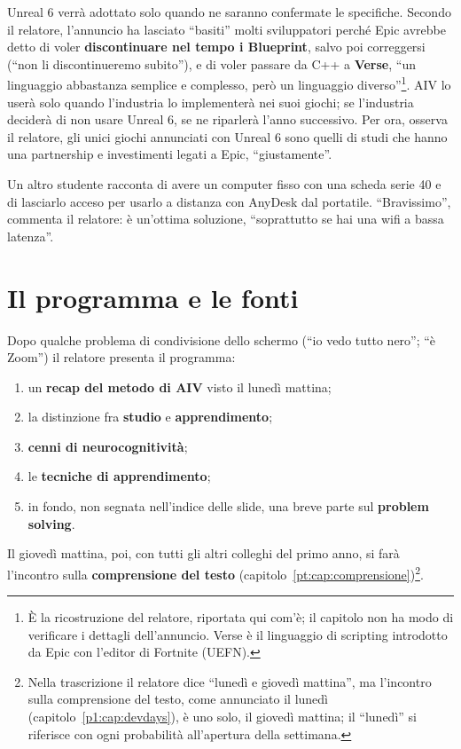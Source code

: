 Unreal 6 verrà adottato solo quando ne saranno confermate le specifiche.
Secondo il relatore, l'annuncio ha lasciato ``basiti'' molti sviluppatori
perché Epic avrebbe detto di voler \textbf{discontinuare nel tempo i
Blueprint}, salvo poi correggersi (``non li discontinueremo subito''), e di
voler passare da C++ a \textbf{Verse}, ``un linguaggio abbastanza semplice e
complesso, però un linguaggio diverso''\footnote{È la ricostruzione del
relatore, riportata qui com'è; il capitolo non ha modo di verificare i
dettagli dell'annuncio. Verse è il linguaggio di scripting introdotto da
Epic con l'editor di Fortnite (UEFN).}. AIV lo userà solo quando l'industria
lo implementerà nei suoi giochi; se l'industria deciderà di non usare
Unreal 6, se ne riparlerà l'anno successivo. Per ora, osserva il relatore,
gli unici giochi annunciati con Unreal 6 sono quelli di studi che hanno una
partnership e investimenti legati a Epic, ``giustamente''.

Un altro studente racconta di avere un computer fisso con una scheda serie
40 e di lasciarlo acceso per usarlo a distanza con AnyDesk dal portatile.
``Bravissimo'', commenta il relatore: è un'ottima soluzione, ``soprattutto
se hai una wifi a bassa latenza''.

\section{Il programma e le fonti}
\label{p0:sec:programma}

Dopo qualche problema di condivisione dello schermo (``io vedo tutto
nero''; ``è Zoom'') il relatore presenta il programma:
\begin{enumerate}
  \item un \textbf{recap del metodo di AIV} visto il lunedì mattina;
  \item la distinzione fra \textbf{studio} e \textbf{apprendimento};
  \item \textbf{cenni di neurocognitività};
  \item le \textbf{tecniche di apprendimento};
  \item in fondo, non segnata nell'indice delle slide, una breve parte sul
        \textbf{problem solving}.
\end{enumerate}
Il giovedì mattina, poi, con tutti gli altri colleghi del primo anno, si
farà l'incontro sulla \textbf{comprensione del testo}
(capitolo~\ref{pt:cap:comprensione})\footnote{Nella
trascrizione il relatore dice ``lunedì e giovedì mattina'', ma l'incontro
sulla comprensione del testo, come annunciato il lunedì
(capitolo~\ref{p1:cap:devdays}), è uno solo, il giovedì mattina; il
``lunedì'' si riferisce con ogni probabilità all'apertura della settimana.}.

